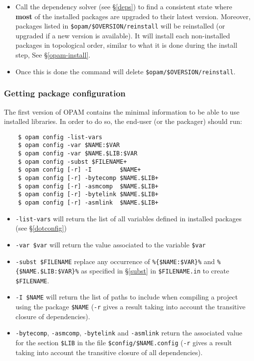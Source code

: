 \documentclass[a4paper,11pt]{article}
\begin{document}
\begin{itemize}

\item Call the dependency solver (see \S\ref{deps}) to
find a consistent state where {\bf most} of the installed packages are
upgraded to their latest version. Moreover, packages listed in
\verb+$opam/$OVERSION/reinstall+ will be reinstalled (or upgraded if a new
version is available). It will install each non-installed packages in
topological order, similar to what it is done during the install step,
See \S\ref{opam-install}.

\item Once this is done the command will delete
  \verb+$opam/$OVERSION/reinstall+.

\end{itemize}

\subsubsection{Getting package configuration}
\label{opam-config}

The first version of OPAM contains the minimal information to be able
to use installed libraries. In order to do so, the end-user (or the
packager) should run:

\begin{verbatim}
    $ opam config -list-vars
    $ opam config -var $NAME:$VAR
    $ opam config -var $NAME.$LIB:$VAR
    $ opam config -subst $FILENAME+
    $ opam config [-r] -I        $NAME+
    $ opam config [-r] -bytecomp $NAME.$LIB+
    $ opam config [-r] -asmcomp  $NAME.$LIB+
    $ opam config [-r] -bytelink $NAME.$LIB+
    $ opam config [-r] -asmlink  $NAME.$LIB+
\end{verbatim}

\begin{itemize}
\item \verb+-list-vars+ will return the list of all variables defined
  in installed packages (see \S\ref{dotconfig})
\item \verb+-var $var+ will return the value associated to the
  variable \verb+$var+
\item \verb+-subst $FILENAME+ replace any occurrence of
  \verb+%{$NAME:$VAR}%+ and \verb+%{$NAME.$LIB:$VAR}%+ as specified in
  \S\ref{subst} in \verb+$FILENAME.in+ to create \verb+$FILENAME+.
\item \verb+-I $NAME+ will return the list of paths to include when
  compiling a project using the package \verb+$NAME+ (\verb+-r+ gives
  a result taking into account the transitive closure of
  dependencies).
\item \verb+-bytecomp+, \verb+-asmcomp+, \verb+-bytelink+ and
  \verb+-asmlink+ return the associated value for the section
  \verb+$LIB+ in the file \verb+$config/$NAME.config+ (\verb+-r+ gives
  a result taking into account the transitive closure of all
  dependencies).
\end{itemize}
\end{document}
